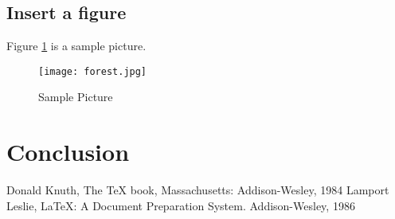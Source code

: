 \documentclass{article}
\begin{document}
\subsection{Insert a figure}
Figure \ref{Sample Picture} is a sample picture.
\begin{figure}[h]
\centering
\texttt{[image: forest.jpg]}
\caption{Sample Picture}
\label{Sample Picture}
\end{figure}
\section{Conclusion}
\begin{thebibliography}{99}
 Donald Knuth, The TeX book, Massachusetts: Addison-Wesley, 1984
 Lamport Leslie, LaTeX: A Document Preparation System. Addison-Wesley, 1986
\end{thebibliography}
\end{document}
